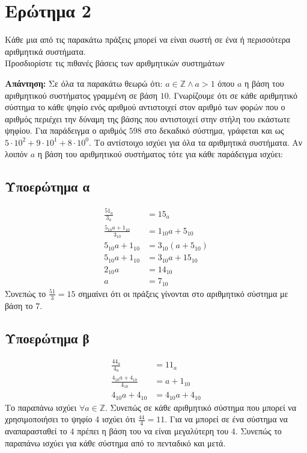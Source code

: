\documentclass[]{article}
\begin{document}
\section{Ερώτημα 2}
Κάθε μια από τις παρακάτω πράξεις μπορεί να είναι σωστή σε ένα ή περισσότερα αριθμητικά συστήματα. \\
Προσδιορίστε τις πιθανές βάσεις των αριθμητικών συστημάτων

\textbf{Απάντηση: }
Σε όλα τα παρακάτω θεωρώ ότι: $a \in \mathbb{Z} \land a > 1$ όπου $a$ η βάση του αριθμητικού συστήματος γραμμένη σε βάση $10$.
Γνωρίζουμε ότι σε κάθε αριθμητικό σύστημα το κάθε ψηφίο ενός αριθμού αντιστοιχεί στον αριθμό των φορών που ο αριθμός περιέχει την δύναμη της βάσης που αντιστοιχεί στην στήλη του εκάστωτε ψηφίου.
Για παράδειγμα ο αριθμός $598$ στο δεκαδικό σύστημα, γράφεται και ως $5 \cdot 10^2 + 9 \cdot 10^1 + 8 \cdot 10^0$. Το αντίστοιχο ισχύει για όλα τα αριθμητικά συστήματα.
Αν λοιπόν $a$ η βάση του αριθμητικού συστήματος τότε για κάθε παράδειγμα ισχύει:
\subsection{Υποερώτημα α}
\begin{align*}
	\frac{51_a}{3_a}                & = 15_a               \\
	\frac{5_{10}a + 1_{10}}{3_{10}} & = 1_{10}a + 5_{10}   \\
	5_{10}a + 1_{10}                & = 3_{10}(a + 5_{10}) \\
	5_{10}a + 1_{10}                & = 3_{10}a + 15_{10}  \\
	2_{10}a                         & = 14_{10}            \\
	a                               & = 7_{10}
\end{align*}
Συνεπώς το $\frac{51}{3} = 15$ σημαίνει ότι οι πράξεις γίνονται στο αριθμητικό σύστημα με βάση το $7$.

\subsection{Υποερώτημα β}
\begin{align*}
	\frac{44_a}{4_a}                & = 11_a             \\
	\frac{4_{10}a + 4_{10}}{4_{10}} & = a + 1_{10}       \\
	4_{10}a + 4_{10}                & = 4_{10}a + 4_{10}
\end{align*}
Το παραπάνω ισχύει $\forall a \in \mathbb{Z}$. Συνεπώς σε κάθε αριθμητικό σύστημα που μπορεί να χρησιμοποιήσει το ψηφίο $4$ ισχύει ότι $\frac{44}{4} = 11$.
Για να μπορεί σε ένα σύστημα να αναπαρασταθεί το $4$ πρέπει η βάση του να είναι μεγαλύτερη του $4$. Συνεπώς το παραπάνω ισχύει για κάθε σύστημα από το πενταδικό και μετά.
\end{document}
